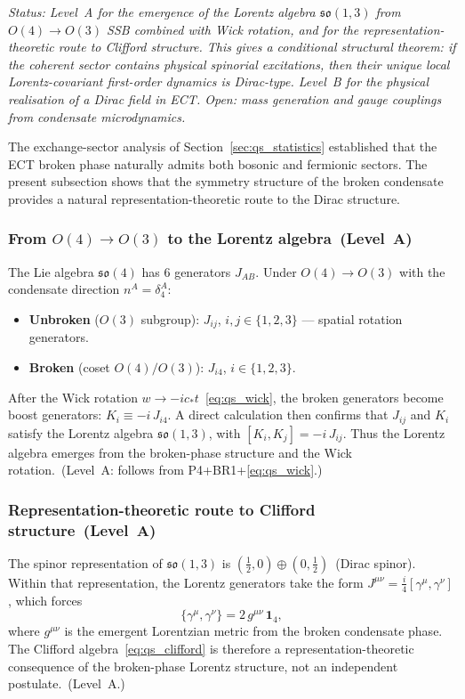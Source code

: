 \documentclass[11pt,a4paper]{article}
\numberwithin{equation}{section}
\begin{document}
\textit{Status: Level~A for the emergence of the Lorentz algebra
$\mathfrak{so}(1,3)$ from $O(4)\to O(3)$ SSB combined with Wick
rotation, and for the representation-theoretic route to Clifford
structure.
This gives a conditional structural theorem: if the coherent sector
contains physical spinorial excitations, then their unique local
Lorentz-covariant first-order dynamics is Dirac-type.
Level~B for the physical realisation of a Dirac field in ECT.
Open: mass generation and gauge couplings from condensate microdynamics.}

\medskip
The exchange-sector analysis of Section~\ref{sec:qs_statistics}
established that the ECT broken phase naturally admits both bosonic
and fermionic sectors.
The present subsection shows that the symmetry structure of the broken
condensate provides a natural representation-theoretic route to
the Dirac structure.

\subsubsection*{From $O(4)\to O(3)$ to the Lorentz algebra~(Level~A)}

The Lie algebra $\mathfrak{so}(4)$ has 6 generators $J_{AB}$.
Under $O(4)\to O(3)$ with the condensate direction $n^A=\delta^A_4$:
\begin{itemize}
  \item \textbf{Unbroken} ($O(3)$ subgroup): $J_{ij}$,
    $i,j\in\{1,2,3\}$ --- spatial rotation generators.
  \item \textbf{Broken} (coset $O(4)/O(3)$): $J_{i4}$,
    $i\in\{1,2,3\}$.
\end{itemize}
After the Wick rotation $w\to-ic_*t$~\eqref{eq:qs_wick},
the broken generators become boost generators:
$K_i\equiv-i\,J_{i4}$.
A direct calculation then confirms that $J_{ij}$ and $K_i$ satisfy
the Lorentz algebra $\mathfrak{so}(1,3)$,
with $[K_i,K_j]=-i\,J_{ij}$.
Thus the Lorentz algebra emerges from the broken-phase structure
and the Wick rotation.~(Level~A: follows from P4+BR1+\eqref{eq:qs_wick}.)

\subsubsection*{Representation-theoretic route to Clifford structure~(Level~A)}

The spinor representation of $\mathfrak{so}(1,3)$ is
$(\tfrac{1}{2},0)\oplus(0,\tfrac{1}{2})$~(Dirac spinor).
Within that representation, the Lorentz generators take the form
$J^{\mu\nu}=\frac{i}{4}[\gamma^\mu,\gamma^\nu]$, which forces
\begin{equation}
  \label{eq:qs_clifford}
  \bigl\{\gamma^\mu,\gamma^\nu\bigr\}
  = 2\,g^{\mu\nu}\,\mathbf{1}_4,
\end{equation}
where $g^{\mu\nu}$ is the emergent Lorentzian metric from the broken
condensate phase.
The Clifford algebra~\eqref{eq:qs_clifford} is therefore a
representation-theoretic consequence of the broken-phase Lorentz
structure, not an independent postulate.~(Level~A.)
\end{document}
